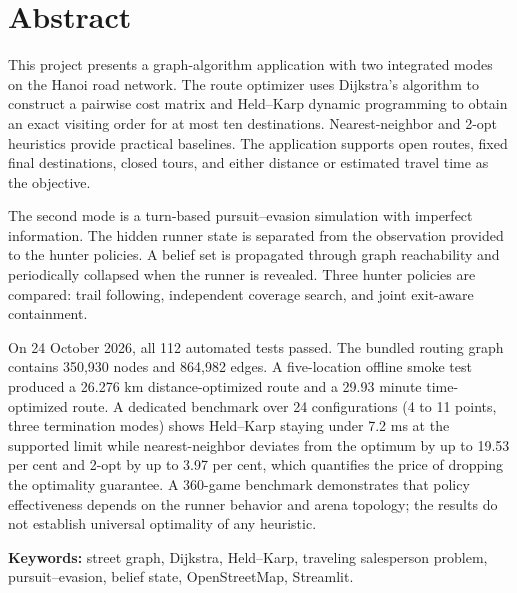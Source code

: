 \chapter*{Abstract}

This project presents a graph-algorithm application with two integrated modes
on the Hanoi road network. The route optimizer uses Dijkstra's algorithm to
construct a pairwise cost matrix and Held--Karp dynamic programming to obtain an
exact visiting order for at most ten destinations. Nearest-neighbor and 2-opt
heuristics provide practical baselines. The application supports open routes,
fixed final destinations, closed tours, and either distance or estimated travel
time as the objective.

The second mode is a turn-based pursuit--evasion simulation with imperfect
information. The hidden runner state is separated from the observation provided
to the hunter policies. A belief set is propagated through graph reachability
and periodically collapsed when the runner is revealed. Three hunter policies
are compared: trail following, independent coverage search, and joint
exit-aware containment.

On 24 October 2026, all 112 automated tests passed. The bundled routing graph
contains 350,930 nodes and 864,982 edges. A five-location offline smoke test
produced a 26.276 km distance-optimized route and a 29.93 minute time-optimized
route. A dedicated benchmark over 24 configurations (4 to 11 points, three
termination modes) shows Held--Karp staying under 7.2 ms at the supported limit
while nearest-neighbor deviates from the optimum by up to 19.53 per cent and
2-opt by up to 3.97 per cent, which quantifies the price of dropping the
optimality guarantee. A 360-game benchmark demonstrates that policy effectiveness depends on
the runner behavior and arena topology; the results do not establish universal
optimality of any heuristic.

\textbf{Keywords:} street graph, Dijkstra, Held--Karp, traveling salesperson
problem, pursuit--evasion, belief state, OpenStreetMap, Streamlit.
\clearpage
